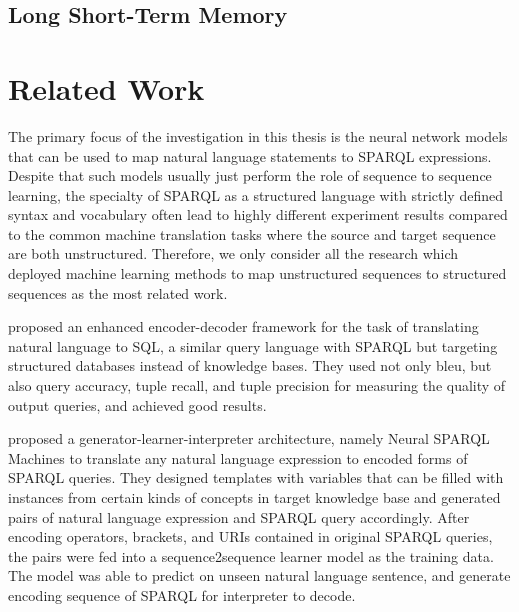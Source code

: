 \subsection{Long Short-Term Memory}


\section{Related Work} \label{section:related work}

The primary focus of the investigation in this thesis is the neural network models that can be used to map natural language statements to SPARQL expressions. Despite that such models usually just perform the role of sequence to sequence learning, the specialty of SPARQL as a structured language with strictly defined syntax and vocabulary often lead to highly different experiment results compared to the common machine translation tasks where the source and target sequence are both unstructured. Therefore, we only consider all the research which deployed machine learning methods to map unstructured sequences to structured sequences as the most related work.

\cite{Cai2017} proposed an enhanced encoder-decoder framework for the task of translating natural language to SQL, a similar query language with SPARQL but targeting structured databases instead of knowledge bases. They used not only bleu, but also query accuracy, tuple recall, and tuple precision for measuring the quality of output queries, and achieved good results.

\cite{Soru2018a,Soru2018} proposed a generator-learner-interpreter architecture, namely Neural SPARQL Machines to translate any natural language expression to encoded forms of SPARQL queries. They designed templates with variables that can be filled with instances from certain kinds of concepts in target knowledge base and generated pairs of natural language expression and SPARQL query accordingly. After encoding operators, brackets, and URIs contained in original SPARQL queries, the pairs were fed into a sequence2sequence learner model as the training data. The model was able to predict on unseen natural language sentence, and generate encoding sequence of SPARQL for interpreter to decode. 